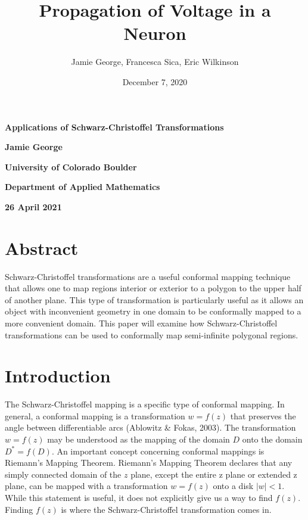 \documentclass{article}
\title{
	
}
\author{\hmwkAuthorName}
\date{}
\title{Propagation of Voltage in a Neuron}
\author{Jamie George, Francesca Sica, Eric Wilkinson}
\date{December 7, 2020}
\begin{document}
\begin{titlepage}
    
    \begin{center}
        \vspace*{2cm}
        
        \Huge
        \textbf{Applications of Schwarz-Christoffel Transformations}
        
        \vspace*{1cm}
        
        \large
        \textbf{Jamie George}
        
        \vspace{1cm}
        
        \Large
        \textbf{University of Colorado Boulder}
        
        \vspace{1cm}
        
        \Large
        \textbf{Department of Applied Mathematics}
        
        \vspace{1cm}
        
        \Large
        \textbf{26 April 2021}
        
    \end{center}
    
\end{titlepage}


\pagebreak

\section{Abstract}
Schwarz-Christoffel transformations are a useful conformal mapping technique that allows one to map regions interior or exterior to a polygon to the upper half of another plane. This type of transformation is particularly useful as it allows an object with inconvenient geometry in one domain to be conformally mapped to a more convenient domain. This paper will examine how Schwarz-Christoffel transformations can be used to conformally map semi-infinite polygonal regions.

\section{Introduction}
The Schwarz-Christoffel mapping is a specific type of conformal mapping. In general, a conformal mapping is a transformation \(w = f(z)\) that preserves the angle between differentiable arcs (Ablowitz \& Fokas, 2003). The transformation \(w = f(z)\) may be understood as the mapping of the domain $D$ onto the domain \(D^{*}=f(D)\). An important concept concerning conformal mappings is Riemann’s Mapping Theorem. Riemann’s Mapping Theorem declares that any simply connected domain of the $z$ plane, except the entire z plane or extended z plane, can be mapped with a transformation \(w = f(z)\) onto a disk \(|w| < 1\). While this statement is useful, it does not explicitly give us a way to find \(f(z)\). Finding \(f(z)\) is where the Schwarz-Christoffel transformation comes in. 
\end{document}
